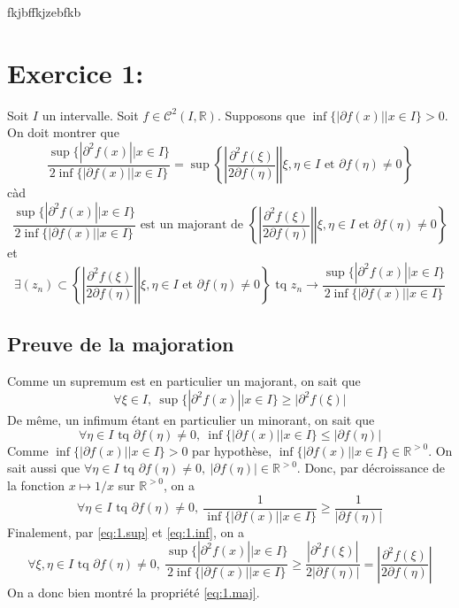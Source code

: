 fkjbffkjzebfkb\documentclass[a4paper, 12pt]{article}
\begin{document}
\newpage
\tableofcontents

\newpage
\section{Exercice 1:}

Soit \( I \) un intervalle. Soit \( f \in \mathcal{C}^2(I, \mathbb{R}) \). Supposons que \( \inf\{|\partial f(x)| | x \in I\} > 0 \). On doit montrer que
$$
\frac{\sup \{ | \partial^2 f(x) || x \in I \}}{2 \inf \{ |\partial f(x)|| x \in I \}}
= \sup \left\{ \left. \left| \frac{\partial^2f(\xi)}{2\partial f(\eta)} \right| \right| \xi, \eta \in I \text{ et } \partial f(\eta) \neq 0 \right\}
$$
càd
\begin{equation}
    \label{eq:1.maj}
    \frac{\sup \{ | \partial^2 f(x) || x \in I \}}{2 \inf \{ |\partial f(x)|| x \in I \}} \text{ est un majorant de }
    \left\{ \left. \left| \frac{\partial^2f(\xi)}{2\partial f(\eta)} \right| \right| \xi, \eta \in I \text{ et } \partial f(\eta) \neq 0 \right\}
\end{equation}
et
\begin{equation}
    \label{eq:1.conv}
    \exists (z_n) \subset
    \left\{ \left. \left| \frac{\partial^2f(\xi)}{2\partial f(\eta)} \right| \right| \xi, \eta \in I \text{ et } \partial f(\eta) \neq 0 \right\}
    \text{ tq } z_n \to
    \frac{\sup \{ | \partial^2 f(x) || x \in I \}}{2 \inf \{ |\partial f(x)|| x \in I \}}
\end{equation}

\subsection{Preuve de la majoration}

Comme un supremum est en particulier un majorant, on sait que
\begin{equation}
    \label{eq:1.sup}
    \forall \xi \in I,~ \sup \{ | \partial^2 f(x) || x \in I \} \geq |\partial^2 f(\xi)|
\end{equation}
De même, un infimum étant en particulier un minorant, on sait que
$$
\forall \eta \in I \text{ tq } \partial f(\eta) \neq 0,~ \inf \{ |\partial f(x)|| x \in I \} \leq |\partial f(\eta)|
$$
Comme \( \inf \{ |\partial f(x)|| x \in I \} > 0 \) par hypothèse, \( \inf \{ |\partial f(x)|| x \in I \} \in \mathbb{R}^{>0} \). On sait aussi que 
\(\forall \eta \in I \text{ tq } \partial f(\eta) \neq 0,~ |\partial f(\eta)| \in \mathbb{R}^{>0} \).
Donc, par décroissance de la fonction \( x \mapsto 1/x \) sur \( \mathbb{R}^{>0} \), on a
\begin{equation}
    \label{eq:1.inf}
    \forall \eta \in I \text{ tq } \partial f(\eta) \neq 0,~ \frac{1}{\inf \{ |\partial f(x)|| x \in I \}} \geq \frac{1}{|\partial f(\eta)|}
\end{equation}
Finalement, par \eqref{eq:1.sup} et \eqref{eq:1.inf}, on a
$$
\forall \xi, \eta \in I \text{ tq } \partial f(\eta) \neq 0,~ \frac{\sup \{ | \partial^2 f(x) || x \in I \}}{2 \inf \{ |\partial f(x)|| x \in I \}}
\geq \frac{| \partial^2f(\xi)|}{2|\partial f(\eta)|}
= \left| \frac{\partial^2f(\xi)}{2\partial f(\eta)} \right|
$$
On a donc bien montré la propriété \eqref{eq:1.maj}.
\end{document}
